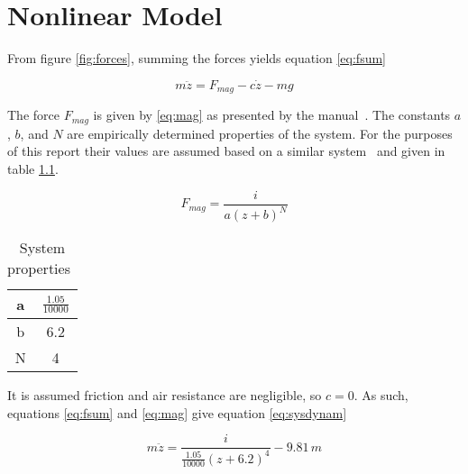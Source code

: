 \chapter{Nonlinear Model} 

From figure \ref{fig:forces}, summing the forces yields equation \ref{eq:fsum}

\begin{equation}
	\label{eq:fsum}
	m\ddot{z} = F_{mag} - c\dot{z} - mg
\end{equation}

The force $F_{mag}$ is given by \ref{eq:mag} as presented by the manual~\cite{manual}.
The constants $a$, $b$, and $N$ are empirically determined properties of the system. 
For the purposes of this report their values are assumed based on a similar system~\cite{paper} and given in table \ref{tbl:magic}.

\begin{equation}
	\label{eq:mag}
	F_{mag} = {\frac {i}{a \left(z+b \right) ^{N}}}
\end{equation}

\begin{table}[h]
	\centering
	\caption{System properties~\cite{paper}}
	\label{tbl:magic}

	\vspace{6pt}
	\begin{tabular}{|c|c|}
		\hline
		a & ${\frac {1.05}{10000}}$ \\
		\hline
		b & 6.2 \\
		\hline
		N & 4 \\
		\hline
	\end{tabular}
\end{table}

It is assumed friction and air resistance are negligible, so $c=0$. 
As such, equations \ref{eq:fsum} and \ref{eq:mag} give equation \ref{eq:sysdynam}

\begin{equation}
	\label{eq:sysdynam}
	m\ddot{z} = {\frac {i}{{\frac {1.05}{10000}} \left(z+6.2 \right) ^{4}}} - 9.81\,m
\end{equation}